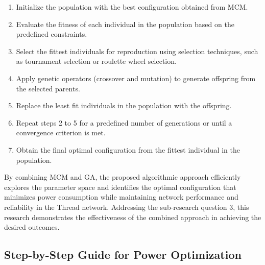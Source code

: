 \begin{enumerate}
    \item Initialize the population with the best configuration obtained from MCM.
    \item Evaluate the fitness of each individual in the population based on the predefined constraints.
    \item Select the fittest individuals for reproduction using selection techniques, such as tournament selection or roulette wheel selection.
    \item Apply genetic operators (crossover and mutation) to generate offspring from the selected parents.
    \item Replace the least fit individuals in the population with the offspring.
    \item Repeat steps 2 to 5 for a predefined number of generations or until a convergence criterion is met.
    \item Obtain the final optimal configuration from the fittest individual in the population.
\end{enumerate}

By combining MCM and GA, the proposed algorithmic approach efficiently explores the parameter space and identifies the optimal configuration that minimizes power consumption while maintaining network performance and reliability in the Thread network. Addressing the sub-research question 3, this research demonstrates the effectiveness of the combined approach in achieving the desired outcomes.

\subsection{Step-by-Step Guide for Power Optimization}

